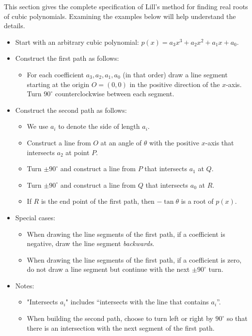 \documentclass[11pt,a4paper]{article}
\begin{document}
This section gives the complete specification of Lill's method for finding real roots of cubic polynomials. Examining the examples below will help understand the details.
\begin{itemize}
\item Start with an arbitrary cubic polynomial: $p(x)=a_3x^3+a_2x^2+a_1x+a_0$.
\item Construct the first path as follows:
\begin{itemize}
\item For each coefficient $a_3,a_2,a_1,a_0$ (in that order) draw a line segment starting at the origin $O=(0,0)$ in the positive direction of the $x$-axis. Turn $90^\circ$ counterclockwise between each segment.
\end{itemize}
\item Construct the second path as follows:
\begin{itemize}
\item We use $a_i$ to denote the side of length $a_i$.
\item Construct a line from $O$ at an angle of $\theta$ with the positive $x$-axis that intersects $a_2$ at point $P$.
\item Turn $\pm 90^\circ$ and construct a line from $P$ that intersects $a_1$ at $Q$.
\item Turn $\pm 90^\circ$ and construct a line from $Q$ that intersects $a_0$ at $R$.
\item If $R$ is the end point of the first path, then $-\tan\theta$ is a root of $p(x)$.
\end{itemize}
\item Special cases:
\begin{itemize}
\item When drawing the line segments of the first path, if a coefficient is negative, draw the line segment \emph{backwards}.
\item When drawing the line segments of the first path, if a coefficient is zero, do not draw a line segment but continue with the next $\pm90^\circ$ turn.
\end{itemize}
\item Notes:
\begin{itemize}
\item "Intersects $a_i$" includes ``intersects with the line that contains $a_i$''.
\item When building the second path, choose to turn left or right by $90^\circ$ so that there is an intersection with the next segment of the first path.
\end{itemize}
\end{itemize}
\end{document}
